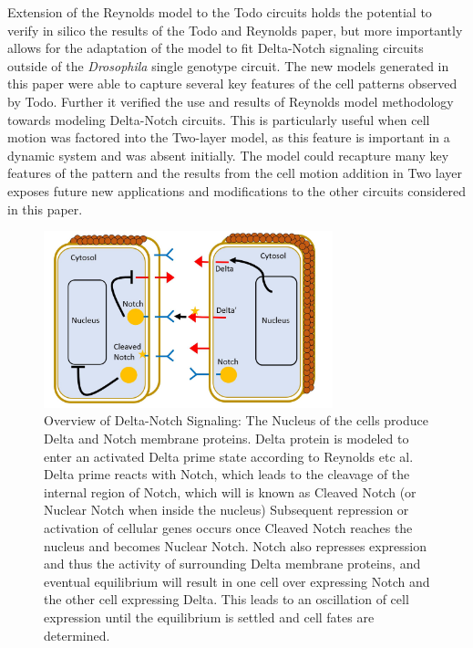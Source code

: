 \documentclass[12pt]{ifacconf}
\begin{document}
Extension of the Reynolds model to the Todo circuits holds the potential to verify in silico the results of the Todo and Reynolds paper, but more importantly allows for the adaptation of the model to fit Delta-Notch signaling circuits outside of the \emph{Drosophila} single genotype circuit. The new models generated in this paper were able to capture several key features of the cell patterns observed by Todo. Further it verified the use and results of Reynolds model methodology towards modeling Delta-Notch circuits. This is particularly useful when cell motion was factored into the Two-layer model, as this feature is important in a dynamic system and was absent initially. The model could recapture many key features of the pattern and the results from the cell motion addition in Two layer exposes future new applications and modifications to the other circuits considered in this paper.

\begin{figure}
\begin{center}
\includegraphics[width=8.4cm]{Overview_of_Delta_Notch} %
\caption{Overview of Delta-Notch Signaling: The Nucleus of the cells produce Delta and Notch membrane proteins. Delta protein is modeled to enter an activated Delta prime state according to Reynolds etc al. Delta prime reacts with Notch, which leads to the cleavage of the internal region of Notch, which will is known as Cleaved Notch (or Nuclear Notch when inside the nucleus) Subsequent repression or activation of cellular genes occurs once Cleaved Notch reaches the nucleus and becomes Nuclear Notch. Notch also represses expression and thus the activity of surrounding Delta membrane proteins, and eventual equilibrium will result in one cell over expressing Notch and the other cell expressing Delta. This leads to an oscillation of cell expression until the equilibrium is settled and cell fates are determined.} 
\label{fig:bifurcation}
\end{center}
\end{figure}
\end{document}
